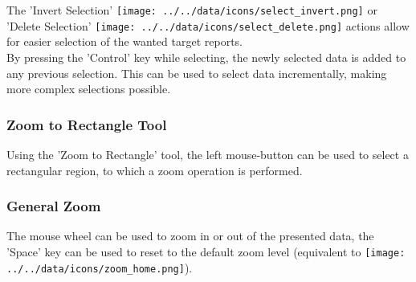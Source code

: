 The 'Invert Selection' \texttt{[image: ../../data/icons/select\_invert.png]} or 'Delete Selection' \texttt{[image: ../../data/icons/select\_delete.png]} actions 
allow for easier selection of the wanted target reports. \\

By pressing the 'Control' key while selecting, the newly selected data is added to any previous selection. This can be used to select data incrementally, making more complex selections possible.

\subsubsection{Zoom to Rectangle Tool}

Using the 'Zoom to Rectangle' tool, the left mouse-button can be used to select a rectangular region, to which a zoom operation is performed. \\

\subsubsection{General Zoom}

The mouse wheel can be used to zoom in or out of the presented data, the 'Space' key can be used to reset to the default zoom level (equivalent to \texttt{[image: ../../data/icons/zoom\_home.png]}).
